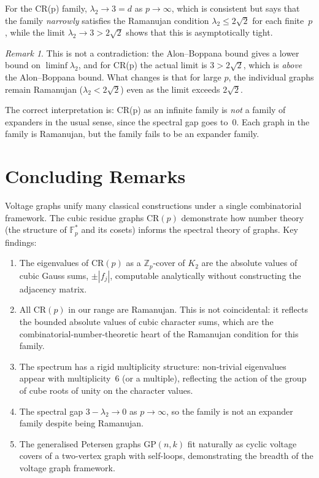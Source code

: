 \documentclass[11pt,a4paper]{article}
\theoremstyle{plain}
\theoremstyle{definition}
\theoremstyle{remark}
\newtheorem{remark}[theorem]{Remark}
\newcommand{\Z}{\mathbb{Z}}
\newcommand{\F}{\mathbb{F}}
\newcommand{\CR}{\mathrm{CR}}
\newcommand{\GP}{\mathrm{GP}}
\begin{document}
For the CR(p) family, $\lambda_2 \to 3 = d$ as $p \to \infty$, which is
consistent but says that the family \emph{narrowly} satisfies the Ramanujan
condition $\lambda_2 \le 2\sqrt{2}$ for each finite~$p$, while the limit
$\lambda_2 \to 3 > 2\sqrt{2}$ shows that this is asymptotically tight.

\begin{remark}
This is not a contradiction: the Alon--Boppana bound gives a lower bound on
$\liminf \lambda_2$, and for CR(p) the actual limit is $3 > 2\sqrt{2}$,
which is \emph{above} the Alon--Boppana bound. What changes is that for large
$p$, the individual graphs remain Ramanujan ($\lambda_2 < 2\sqrt{2}$) even as
the limit exceeds $2\sqrt{2}$.

The correct interpretation is: CR(p) as an infinite family is \emph{not}
a family of expanders in the usual sense, since the spectral gap goes to~0.
Each graph in the family is Ramanujan, but the family fails to be an expander family.
\end{remark}


\section{Concluding Remarks}

Voltage graphs unify many classical constructions under a single combinatorial
framework. The cubic residue graphs $\CR(p)$ demonstrate how number theory
(the structure of $\F_p^*$ and its cosets) informs the spectral theory of
graphs. Key findings:

\begin{enumerate}
  \item The eigenvalues of $\CR(p)$ as a $\Z_p$-cover of $K_2$ are the
    absolute values of cubic Gauss sums, $\pm |f_j|$, computable analytically
    without constructing the adjacency matrix.

  \item All $\CR(p)$ in our range are Ramanujan. This is not coincidental:
    it reflects the bounded absolute values of cubic character sums, which are
    the combinatorial-number-theoretic heart of the Ramanujan condition for
    this family.

  \item The spectrum has a rigid multiplicity structure: non-trivial eigenvalues
    appear with multiplicity~6 (or a multiple), reflecting the action of the
    group of cube roots of unity on the character values.

  \item The spectral gap $3 - \lambda_2 \to 0$ as $p \to \infty$, so the
    family is not an expander family despite being Ramanujan.

  \item The generalised Petersen graphs $\GP(n,k)$ fit naturally as cyclic
    voltage covers of a two-vertex graph with self-loops, demonstrating the
    breadth of the voltage graph framework.
\end{enumerate}
\end{document}
